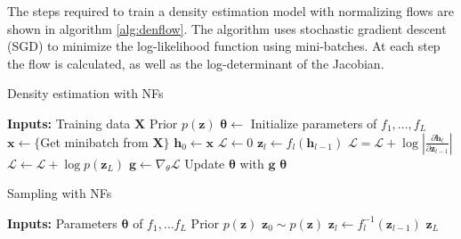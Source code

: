 \documentclass{article}
\begin{document}
The steps required to train a density estimation model with normalizing flows are shown in algorithm \ref{alg:denflow}. The algorithm uses stochastic gradient descent (SGD) to minimize the log-likelihood function using mini-batches. At each step the flow is calculated, as well as the log-determinant of the Jacobian.

\begin{minipage}[t]{\textwidth}
\centering
\begin{minipage}[t]{0.45\textwidth}
\begin{algorithm}[H]
    \caption{Density estimation with NFs}
    \label{alg:denflow}
    \begin{algorithmic}
    \STATE \textbf{Inputs:} Training data $\mathbf{X}$
    \STATE \hspace{32pt} Prior $p(\mathbf{z})$
	\STATE $\boldsymbol{\theta} \leftarrow$ Initialize parameters of $f_1, \dots, f_L$
        \STATE $\mathbf{x} \leftarrow \lbrace$Get minibatch from $\mathbf{X}\rbrace$
        \STATE $\mathbf{h}_0 \leftarrow \mathbf{x}$
        \STATE $\mathcal{L} \leftarrow 0$
			\STATE $\mathbf{z}_l \leftarrow f_l(\mathbf{h}_{l-1})$
			\STATE $\mathcal{L} = \mathcal{L} + \log\left\vert \frac{\partial \mathbf{h}_l}{\partial \mathbf{z}_{l-1}}\right\vert$
        \ENDFOR
        \STATE $\mathcal{L} \leftarrow \mathcal{L} + \log p(\mathbf{z}_L)$
        \STATE $\mathbf{g} \leftarrow \nabla_\theta\mathcal{L}$
        \STATE Update $\boldsymbol{\theta}$ with $\mathbf{g}$
	\ENDWHILE
	\RETURN $\boldsymbol{\theta}$
    \end{algorithmic}
\end{algorithm}
\end{minipage}
\hspace{10pt}
\begin{minipage}[t]{0.45\textwidth}
\begin{algorithm}[H]
    \caption{Sampling with NFs}
    \label{alg:sampleflow}
    \begin{algorithmic}
    \STATE \textbf{Inputs:} Parameters $\boldsymbol{\theta}$ of $f_1, \dots f_L$
    \STATE \hspace{32pt} Prior $p(\mathbf{z})$
    \STATE $\mathbf{z}_0\sim p(\mathbf{z})$
		\STATE $\mathbf{z}_l \leftarrow f_l^{-1}(\mathbf{z}_{l-1})$
	\ENDFOR
	\RETURN $\mathbf{z}_L$
    \end{algorithmic}
\end{algorithm}
\end{minipage}
\vspace{10pt}
\end{minipage}
\end{document}

